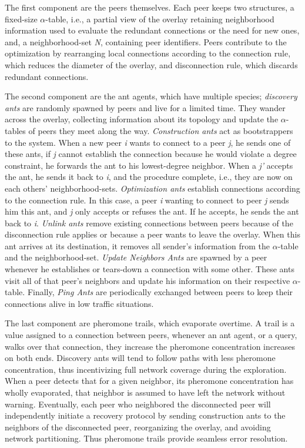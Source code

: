 \documentclass[runningheads]{llncs}
\begin{document}
The first component are the peers themselves. Each peer keeps two structures, a   fixed-size $\alpha$-table, i.e., a partial view of the overlay retaining neighborhood information used to evaluate the redundant connections or the need for new ones, and, a neighborhood-set \textit{N}, containing peer identifiers. Peers contribute to the optimization by rearranging local connections according to the connection rule, which reduces the diameter of the overlay, and disconnection rule, which discards redundant connections.

The second component are the ant agents, which have multiple species; \textit{discovery ants} are randomly spawned by peers and live for a limited time. They wander across the overlay, collecting information about its topology and update the $\alpha$-tables of peers they meet along the way. \textit{Construction ants} act as bootstrappers to the system. When a new peer \textit{i} wants to connect to a peer \textit{j}, he sends one of these ants, if \textit{j} cannot establish the connection because he would violate a degree constraint, he forwards the ant to his lowest-degree neighbor. When a \textit{j'} accepts the ant, he sends it back to \textit{i}, and the procedure complete, i.e., they are now on each others' neighborhood-sets. \textit{Optimization ants} establish connections according to the connection rule. In this case, a peer \textit{i} wanting to connect to peer \textit{j} sends him this ant, and \textit{j} only accepts or refuses the ant. If he accepts, he sends the ant back to \textit{i}. \textit{Unlink ants} remove existing connections between peers because of the disconnection rule applies or because a peer wants to leave the overlay. When this ant arrives at its destination, it removes all sender's information from the $\alpha$-table and the neighborhood-set. \textit{Update Neighbors Ants} are spawned by a peer whenever he establishes or tears-down a connection with some other. These ants visit all of that peer's neighbors and update his information on their respective $\alpha$-table. Finally, \textit{Ping Ants} are periodically exchanged between peers to keep their connections alive in low traffic situations.

The last component are pheromone trails, which evaporate overtime. A trail is a value assigned to a connection between peers, whenever an ant agent, or a query, walks over that connection, they increase the pheromone concentration increases on both ends. Discovery ants will tend to follow paths with less pheromone concentration, thus incentivizing full network coverage during the exploration. When a peer detects that for a given neighbor, its pheromone concentration has wholly evaporated, that neighbor is assumed to have left the network without warning. Eventually, each peer who neighbored the disconnected peer will independently initiate a recovery protocol by sending construction ants to the neighbors of the disconnected peer, reorganizing the overlay, and avoiding network partitioning. Thus pheromone trails provide seamless error resolution.
\end{document}
